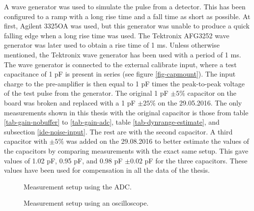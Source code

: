 \documentclass[../main/thesis.tex]{subfiles}
\begin{document}
A wave generator was used to simulate the pulse from a detector. This has been configured to a ramp with a long rise time and a fall time as short as possible. At first, Agilent 3325OA was used, but this generator was unable to produce a quick falling edge when a long rise time was used. The Tektronix AFG3252 wave generator was later used to obtain a rise time of 1 ms. Unless otherwise mentioned, the Tektronix wave generator has been used with a period of 1 ms. The wave generator is connected to the external calibrate input, where a test capacitance of 1 pF is present in series (see figure \ref{fig-capmount}). The input charge to the pre-amplifier is then equal to 1 pF times the peak-to-peak voltage of the test pulse from the generator. The original 1 pF $\pm5\%$ capacitor on the board was broken and replaced with a 1 pF $\pm25\%$ on the 29.05.2016. The only measurements shown in this thesis with the original capacitor is those from table \ref{tab-gain-nobuffer} to \ref{tab-gain-adc}, table \ref{tab-dynrange-estimate}, and subsection \ref{ide-noise-input}. The rest are with the second capacitor. A third capacitor with $\pm5\%$ was added on the 29.08.2016 to better estimate the values of the capacitors by comparing measurements with the exact same setup. This gave values of 1.02 pF, 0.95 pF, and 0.98 pF $\pm0.02$ pF for the three capacitors. These values have been used for compensation in all the data of the thesis.

\begin{figure}
\centering
{}
\caption{Measurement setup using the ADC.}
\label{fig-setup-adc}
\end{figure}

\begin{figure}
	\centering
	\caption{Measurement setup using an oscilloscope.}
	\label{fig-setup-scope}
\end{figure}
\end{document}
